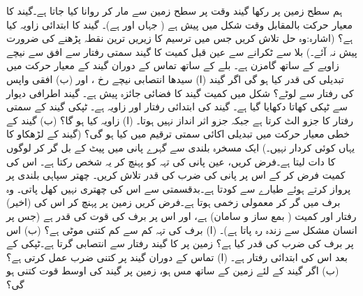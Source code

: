 ہم سطح زمین پر  رکھا گیند   وقت  پر  سطح  زمین سے مار کر  روانا کیا جاتا ہے۔گیند کا معیار حرکت  بالمقابل وقت  شکل  میں پیش ہے ( جہاں  اور  ہے)۔ گیند کا ابتدائی زاویہ کیا ہے؟ (اشارہ:وہ حل تلاش کریں جس میں ترسیم کا زیریں ترین نقطہ پڑھنے کی ضرورت پیش نہ آئے۔)
بلا سے ٹکرانے سے عین قبل   کمیت  کا گیند  سمتی رفتار سے افق سے نیچے  زاویے کے ساتھ گامزن ہے۔ بلے کے ساتھ تماس کے دوران گیند کے معیار حرکت میں تبدیلی کی قدر  کیا ہو گی   اگر  گیند (ا) سیدھا انتصابی  نیچے  رخ ، اور (ب) افقی واپس  کی رفتار سے لوٹے؟
شکل  میں    کمیت  گیند  کا   فضائی جائزہ پیش ہے۔ گیند  اطرافی  دیوار  سے  ٹپکی کھاتا   دکھایا گیا ہے۔ گیند کی ابتدائی رفتار  اور زاویہ  ہے۔ ٹپکی گیند  کے سمتی رفتار کا  جزو الٹ کرتا ہے جبکہ  جزو اثر انداز نہیں ہوتا۔ (ا) زاویہ  کیا ہو گا؟ (ب) گیند کے خطی معیار حرکت میں تبدیلی اکائی سمتی ترقیم میں کیا ہو گی؟ (گیند کے   لڑھکاو  کا یہاں کوئی کردار نہیں۔)
ایک مسخرہ  بلندی سے  گہرے پانی میں  پیٹ کے بل گر کر لوگوں کا دات لیتا ہے۔فرض کریں، عین  پانی کی تہہ کو پہنچ کر یہ شخص   رکتا ہے۔ اس کی کمیت فرض کر کے اس پر پانی کی  ضرب کی قدر تلاش کریں۔
 چھتر سپاہی   بلندی  پر پرواز کرتے  ہوئے طیارے سے کودتا ہے۔بدقسمتی سے اس کی چھتری نہیں کھل پاتی۔ وہ برف میں گر کر معمولی زخمی ہوتا ہے۔فرض کریں زمین پر پہنچ کر  اس کی (اخیر) رفتار   اور   کمیت  ( بمع ساز و سامان)  ہے، اور  اس پر برف کی قوت کی قدر  ہے (جس پر انسان مشکل سے زندہ رہ پاتا ہے)۔ (ا) برف کی تہہ کم سے کم کتنی موٹی ہے؟ (ب)  اس پر برف کی ضرب کی قدر کیا ہے؟
زمین پر  کا  گیند    رفتار سے انتصابی  گرتا ہے۔ٹپکی کے بعد اس کی ابتدائی رفتار  ہے۔ (ا)  تماس کے دوران گیند پر کتنی ضرب  عمل کرتی ہے؟ (ب)  اگر گیند  کے لئے زمین کے ساتھ مس ہو، زمین پر گیند کی اوسط قوت کتنی ہو گی؟
